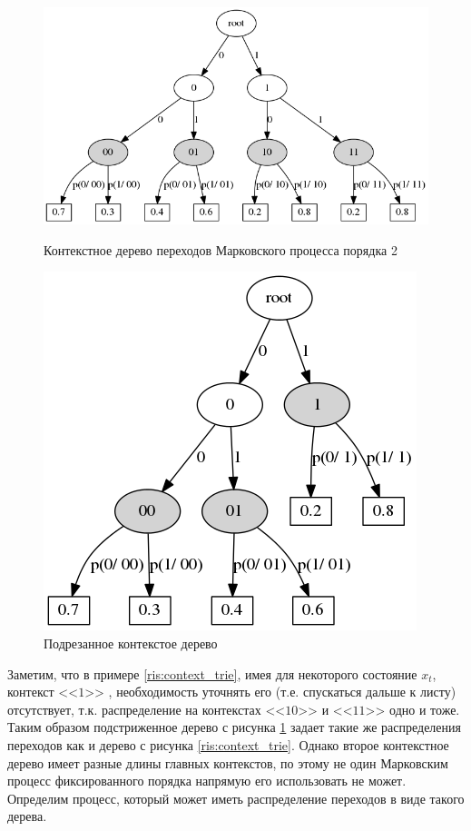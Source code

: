 \documentclass{matmex-diploma-custom}
\begin{document}
\begin{figure}[h!]\centering
\begin{minipage}[b]{0.49 \textwidth}
	\includegraphics[scale=0.3]{img/Context_trie.png}
	\centering
	\caption{ Контекстное дерево переходов Марковского процесса порядка 2 }
	\label{ris:context_trie}
	
\end{minipage}
\hfil \hfil
\begin{minipage}[b]{0.49 \textwidth}
	\includegraphics[scale=0.3]{img/Prune_c_trie.png}
	\centering
	\caption{ Подрезанное контекстое дерево }
	\label{ris:prune_c_trie}
\end{minipage}
\end{figure}

Заметим, что в примере \ref{ris:context_trie}, имея для некоторого состояние $x_{t}$, контекст  <<$1$>> , необходимость уточнять его (т.е. спускаться дальше к листу) отсутствует, т.к. распределение на контекстах  <<$10$>>  и  <<$11$>>  одно и тоже. 
Таким образом подстриженное дерево с рисунка \ref{ris:prune_c_trie} задает такие же распределения переходов как и дерево с рисунка \ref{ris:context_trie}. 
Однако второе контекстное дерево имеет разные длины главных контекстов, по этому не один Марковским процесс фиксированного порядка напрямую его использовать не может.
Определим процесс, который может иметь распределение переходов в виде такого дерева.
\end{document}
